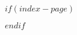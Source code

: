 $if(index-page)$
\tocskipone
\tocprintchapternonum

\begingroup
\ABNTEXfontereduzida
\renewcommand{\baselinestretch}{1}
\setlength{\parindent}{0pt}
\setlength{\parskip}{\tinyskipamount}
\setlength{\afterchapskip}{\hugeskipamount}
\printindex
\endgroup
$endif$
